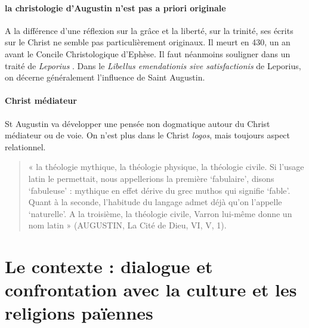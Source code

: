 \paragraph{la christologie d'Augustin n'est pas a priori originale} A la différence d'une réflexion sur la grâce et la liberté, sur la trinité, ses écrits sur le Christ ne semble pas particulièrement originaux. Il meurt en 430, un an avant le Concile Christologique d'Ephèse. Il faut néanmoins souligner dans un traité de \textit{Leporius} . Dans le \emph{Libellus emendationis sive satisfactionis} de Leporius, on décerne généralement l'influence de Saint Augustin. 

\paragraph{Christ médiateur} St Augustin va développer une pensée non dogmatique autour du Christ médiateur ou de voie. On n'est plus dans le Christ \textit{logos}, mais toujours aspect relationnel.




\begin{quote}
    « la théologie mythique, la théologie physique, la théologie civile. Si l’usage latin le permettait, nous appellerions la première ‘fabulaire’, disons ‘fabuleuse’ : mythique en effet dérive du grec muthos qui signifie ‘fable’. Quant à la seconde, l’habitude du langage admet déjà qu’on l’appelle ‘naturelle’.  A la troisième, la théologie civile, Varron lui-même donne un nom latin » (AUGUSTIN, La Cité de Dieu, VI, V, 1).  
\end{quote}



 


\section{Le contexte : dialogue et confrontation avec la culture et les religions païennes }


